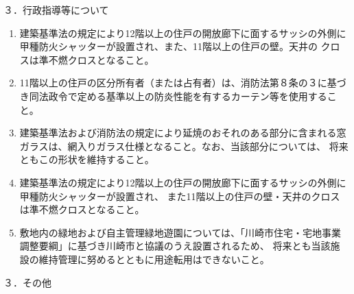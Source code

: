 \documentclass[12pt,uplatex,dvipdfmx]{jsarticle}
\begin{document}
３．行政指導等について
\begin{enumerate}
\item 建築基準法の規定により12階以上の住戸の開放廊下に面するサッシの外側に甲種防火シャッターが設置され、また、11階以上の住戸の壁。天井の
      クロスは準不燃クロスとなること。
\item 11階以上の住戸の区分所有者（または占有者）は、消防法第８条の３に基づき同法政令で定める基準以上の防炎性能を有するカーテン等を使用すること。
\item 建築基準法および消防法の規定により延焼のおそれのある部分に含まれる窓ガラスは、網入りガラス仕様となること。なお、当該部分については、
      将来ともこの形状を維持すること。
\item 建築基準法の規定により12階以上の住戸の開放廊下に面するサッシの外側に甲種防火シャッターが設置され、
      また11階以上の住戸の壁・天井のクロスは準不燃クロスとなること。
\item 敷地内の緑地および自主管理緑地遊園については、「川崎市住宅・宅地事業調整要綱」に基づき川崎市と協議のうえ設置されるため、
      将来とも当該施設の維持管理に努めるとともに用途転用はできないこと。
\end{enumerate}
３．その他
\end{document}
